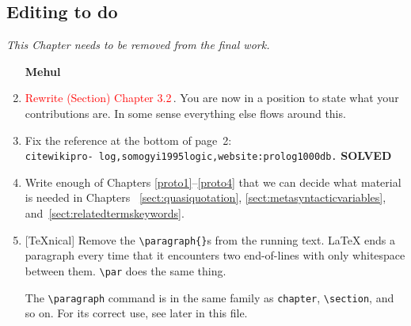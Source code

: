 
\begin{scope}
\nolinenumbers
\chapter{Editing to do}\label{chap:to-do}

\textit{\color{red} This Chapter needs to be removed from the final
  work.}

\begin{enumerate}
\item [\textbf{Mehul}]

\item
  \textcolor{red}{Rewrite (Section) Chapter 3.2}\,.
  You are now in a position to state what your contributions are.
  In some sense everything else flows around this.

\item
  Fix the reference at the bottom of page~2:\\
  \Verb!citewikipro- log,somogyi1995logic,website:prolog1000db.!  \textbf{SOLVED}
\item
  Write enough of Chapters \ref{proto1}--\ref{proto4} that we can decide
  what material is needed in Chapters~ \ref{sect:quasiquotation},
  \ref{sect:metasyntacticvariables},
  and~\ref{sect:relatedtermskeywords}.
\item
  {}[\TeX{}nical]
  Remove the \Verb!\paragraph{}!s from the running text.  \LaTeX{}
  ends a paragraph every time that it encounters two end-of-lines
  with only whitespace between them.  \Verb!\par! does the same thing.

  The \Verb!\paragraph! command is in the same family as \Verb!chapter!,
  \Verb!\section!, and so on.  For its correct use, see later in this
  file.


\end{enumerate}
\end{scope}
